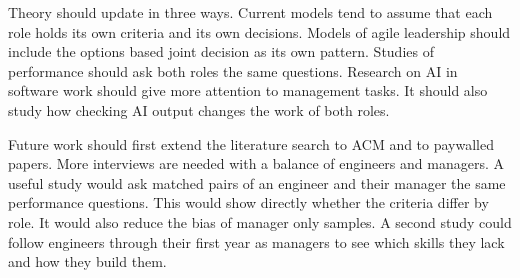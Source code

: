 \documentclass[conference]{IEEEtran}
\begin{document}
Theory should update in three ways. Current models tend to assume that each role holds its own criteria and its own decisions. Models of agile leadership should include the options based joint decision as its own pattern. Studies of performance should ask both roles the same questions. Research on AI in software work should give more attention to management tasks. It should also study how checking AI output changes the work of both roles.

Future work should first extend the literature search to ACM and to paywalled papers. More interviews are needed with a balance of engineers and managers. A useful study would ask matched pairs of an engineer and their manager the same performance questions. This would show directly whether the criteria differ by role. It would also reduce the bias of manager only samples. A second study could follow engineers through their first year as managers to see which skills they lack and how they build them.
\end{document}
